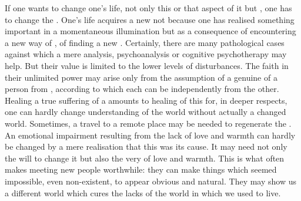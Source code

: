 \pa If one wants to change {one's life}, not only this or that aspect of it but
, one has to change the .  One's life acquires a new
 not because one has realised something important in a momentaneous
illumination but as a consequence of encountering a new way of , of finding a new .  Certainly, there are many
pathological cases against which a mere analysis, psychoanalysis or cognitive
psychotherapy may help.  But their value is limited to the lower levels of
 disturbances.  The faith in their unlimited power may arise only
from the assumption of a genuine  of a person from , according to which each can be  independently from the
other.   Healing a true suffering of a  amounts
to healing  of this  for, in deeper respects, one can
hardly change understanding 
of the world without actually  a changed world.  Sometimes, a
travel to a remote place may be needed to regenerate the .  An
emotional impairment resulting from the lack of love and warmth can hardly be
changed by a mere realisation that this was its cause.  It may need not only the
will to change it but also the very  of love and
warmth.
  This is what 
often makes meeting new people worthwhile: they can make things which seemed
impossible, even non-existent, to appear obvious and natural.  They may show us
a different world which cures the lacks of the world in which we used to live.


